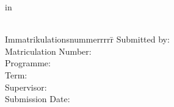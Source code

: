 \begin{titlepage}
	\begin{centering}
		\Large \textbf{\Institution}\\
		\Large \Programme \\
		\vfill
		\LARGE \textbf{\Title} \\
		\Subtitle \\
		\vfill
		\LARGE \AsssignmentName \\ %
		\Large in \\
		\LARGE  \Class \\
		\vfill
		\begin{small}
			\begin{doublespace}
				\begin{tabbing}
					Immatrikulationsnummerrrrr\=\kill
					Submitted by:\>\Name\\
					Matriculation Number:\>\MatrikelNummer\\
					Programme:\>\Programme\\
					Term:\>\Semester\\
					Supervisor:\>\Supervisor\\
					Submission Date:\>\Date
				\end{tabbing}
			\end{doublespace}
		\end{small}
	\end{centering}\vspace{1cm}
\end{titlepage}